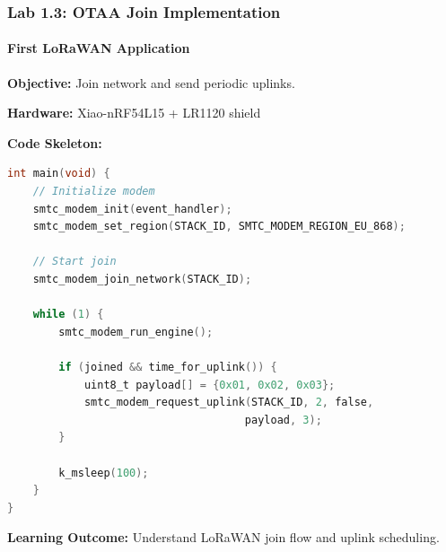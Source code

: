 \documentclass{beamer}
\begin{document}
\begin{frame}[fragile]
\frametitle{Lab 1.3: OTAA Join Implementation}
\framesubtitle{First LoRaWAN Application}

\textbf{Objective:} Join network and send periodic uplinks.

\textbf{Hardware:} Xiao-nRF54L15 + LR1120 shield

\vspace{1em}

\textbf{Code Skeleton:}
\begin{lstlisting}[language=C, basicstyle=\tiny\ttfamily]
int main(void) {
    // Initialize modem
    smtc_modem_init(event_handler);
    smtc_modem_set_region(STACK_ID, SMTC_MODEM_REGION_EU_868);

    // Start join
    smtc_modem_join_network(STACK_ID);

    while (1) {
        smtc_modem_run_engine();

        if (joined && time_for_uplink()) {
            uint8_t payload[] = {0x01, 0x02, 0x03};
            smtc_modem_request_uplink(STACK_ID, 2, false,
                                     payload, 3);
        }

        k_msleep(100);
    }
}
\end{lstlisting}

\textbf{Learning Outcome:} Understand LoRaWAN join flow and uplink scheduling.
\end{frame}
\end{document}
